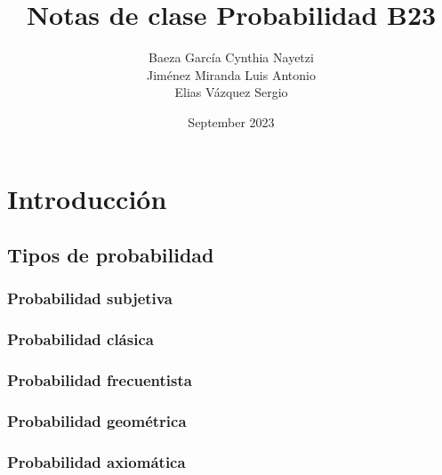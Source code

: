 \documentclass{article}
\title{Notas de clase Probabilidad B23}
\author{ Baeza García Cynthia Nayetzi \\
        Jiménez Miranda Luis Antonio  \\
        Elias Vázquez Sergio }
\date{September 2023}
\begin{document}
\begin{titlepage}
    \maketitle
\end{titlepage}

\tableofcontents

\clearpage

\section{Introducción}

\subsection{Tipos de probabilidad}


\subsubsection{Probabilidad subjetiva}


\subsubsection{Probabilidad clásica}


\subsubsection{Probabilidad frecuentista}


\subsubsection{Probabilidad geométrica}


\subsubsection{Probabilidad axiomática}

\end{document}
